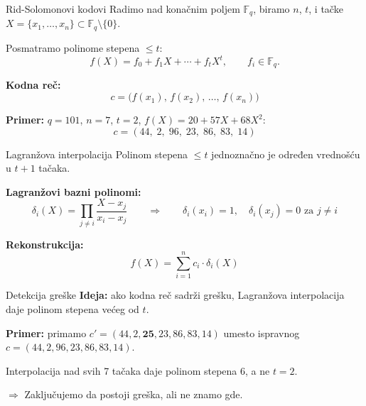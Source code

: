 \documentclass[aspectratio=1610]{beamer}
\begin{document}
\begin{frame}{Rid-Solomonovi kodovi}
Radimo nad konačnim poljem $\mathbb{F}_q$, biramo $n$, $t$,
i tačke $X = \{x_1, \ldots, x_n\} \subset \mathbb{F}_q \setminus \{0\}$.
 
\vspace{0.6em}
Posmatramo polinome stepena $\leq t$:
\[f(X) = f_0 + f_1 X + \cdots + f_t X^t, \qquad f_i \in \mathbb{F}_q.\]
 
\textbf{Kodna reč:}
\[c = \bigl(f(x_1),\, f(x_2),\, \ldots,\, f(x_n)\bigr)\]
 
\vspace{0.4em}
\textbf{Primer:} $q=101$, $n=7$, $t=2$, $f(X) = 20 + 57X + 68X^2$:
\[c = (44,\; 2,\; 96,\; 23,\; 86,\; 83,\; 14)\]
\end{frame}
 
\begin{frame}{Lagranžova interpolacija}
Polinom stepena $\leq t$ jednoznačno je određen vrednošću u $t+1$ tačaka.
 
\vspace{0.8em}
\textbf{Lagranžovi bazni polinomi:}
\[\delta_i(X) = \prod_{j \neq i} \frac{X - x_j}{x_i - x_j}
\qquad \Rightarrow \qquad
\delta_i(x_i) = 1, \quad \delta_i(x_j) = 0 \text{ za } j \neq i\]
 
\textbf{Rekonstrukcija:}
\[f(X) = \sum_{i=1}^{n} c_i \cdot \delta_i(X)\]
 
\end{frame}

 \begin{frame}{Detekcija greške}
\textbf{Ideja:} ako kodna reč sadrži grešku, Lagranžova interpolacija
daje polinom stepena većeg od $t$.
 
\vspace{0.8em}
\textbf{Primer:} primamo $c' = (44, 2, \mathbf{25}, 23, 86, 83, 14)$
umesto ispravnog $c = (44, 2, 96, 23, 86, 83, 14)$.
 
\vspace{0.6em}
Interpolacija nad svih 7 tačaka daje polinom stepena 6, a ne $t = 2$.
 
\vspace{0.6em}
$\Rightarrow$ Zaključujemo da postoji greška, ali ne znamo gde.
\end{frame}
\end{document}
